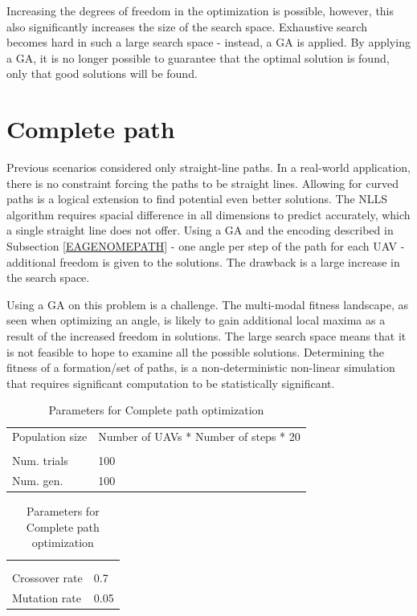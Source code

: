 \documentclass[10pt,a4paper]{book}
\begin{document}
Increasing the degrees of freedom in the optimization is possible, however, this also significantly increases the size of the search space. Exhaustive search becomes hard in such a large search space -  instead, a \gls{GA} is applied. By applying a \gls{GA}, it is no longer possible to guarantee that the optimal solution is found, only that good solutions will be found.

\newpage

\section{Complete path}


\label{Res_CP}

Previous scenarios considered only straight-line paths. In a real-world application, there is no constraint forcing the paths to be straight lines. Allowing for curved paths is a logical extension to find potential even better solutions. The \gls{NLLS} algorithm requires spacial difference in all dimensions to predict accurately, which a single straight line does not offer. Using a \gls{GA} and the encoding described in Subsection \ref{EAGENOMEPATH} - one angle per step of the path for each \gls{UAV} - additional freedom is given to the solutions. The drawback is a large increase in the search space. 

Using a \gls{GA} on this problem is a challenge. The multi-modal fitness landscape, as seen when optimizing an angle, is likely to gain additional local maxima as a result of the increased freedom in solutions. The large search space means that it is not feasible to hope to examine all the possible solutions. Determining the fitness of a formation/set of paths, is a non-deterministic non-linear simulation that requires significant computation to be statistically significant.

\begin{table}[H]
\centering
\caption{Parameters for Complete path optimization}
\begin{minipage}{50mm}
\small
\begin{tabular}{l l}
Population size & Number of UAVs * Number of steps * 20   \\  
& \\
Num. trials & 100  \\
Num. gen. & 100  

\end{tabular}
\end{minipage}
\centering
\begin{minipage}{50mm}
\small
\begin{tabular}{l l}
& \\
& \\
Crossover rate & 0.7 \\ 
Mutation rate & 0.05 

\end{tabular}

\end{minipage}
\label{FIG_CP_PARAMS}
\end{table}
\end{document}
